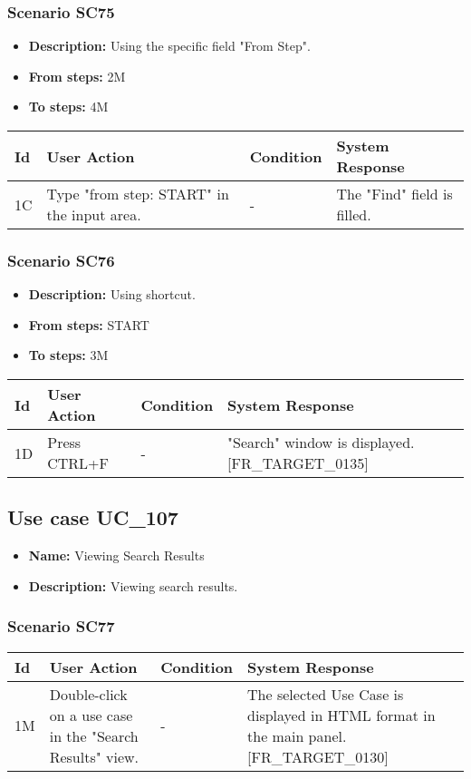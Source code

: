\documentclass[a4paper,11pt]{article}
\newcommand{\bl}{\\ \hline}
\begin{document}
\subsubsection*{Scenario SC75}
\begin{itemize}
\item {\bf Description:} Using the specific field "From Step".
\item {\bf From steps:} 2M
\item {\bf To steps:} 4M
\end{itemize}
\begin{tabular}{|p{0.4in}|p{1.5in}|p{1.5in}|p{1.5in}|}
\hline
Id & User Action & Condition & System Response \bl 
1C & Type "from step: START" in the input area. & - & The "Find" field is filled.\bl
\end{tabular}
\subsubsection*{Scenario SC76}
\begin{itemize}
\item {\bf Description:} Using shortcut.
\item {\bf From steps:} START
\item {\bf To steps:} 3M
\end{itemize}
\begin{tabular}{|p{0.4in}|p{1.5in}|p{1.5in}|p{1.5in}|}
\hline
Id & User Action & Condition & System Response \bl 
1D & Press CTRL+F & - & "Search" window is displayed. [FR_TARGET_0135]\bl
\end{tabular}
\subsection*{Use case UC_107}
\begin{itemize}
\item {\bf Name: }Viewing Search Results
\item {\bf Description: }Viewing search results.
\end{itemize}
\subsubsection*{Scenario SC77}
\begin{tabular}{|p{0.4in}|p{1.5in}|p{1.5in}|p{1.5in}|}
\hline
Id & User Action & Condition & System Response \bl 
1M & Double-click on a use case in the "Search Results" view.
					 & - & The selected Use Case is displayed in HTML format in the
						main panel. [FR_TARGET_0130] \bl
\end{tabular}
\end{document}
